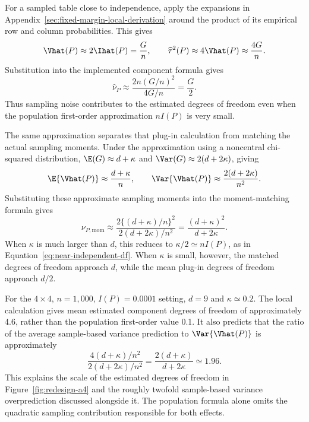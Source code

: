 For a sampled table close to independence, apply the expansions in
Appendix~\ref{sec:fixed-margin-local-derivation} around the product of its
empirical row and column probabilities. This gives
\begin{equation}
 \Vhat(P)\approx2\Ihat(P)=\frac{G}{n},
 \qquad \widehat\tau^2(P)\approx4\Vhat(P)\approx\frac{4G}{n}.
 \label{eq:small-mi-plugin-moments}
\end{equation}
Substitution into the implemented component formula gives
\begin{equation}
 \widehat\nu_P
 \approx\frac{2n(G/n)^2}{4G/n}=\frac{G}{2}.
 \label{eq:small-mi-plugin-df}
\end{equation}
Thus sampling noise contributes to the estimated degrees of freedom even
when the population first-order approximation \(nI(P)\) is very small.

The same approximation separates that plug-in calculation from matching
the actual sampling moments. Under the approximation using a noncentral
chi-squared distribution, \(\E(G)\approx d+\kappa\) and
\(\Var(G)\approx2(d+2\kappa)\), giving
\begin{equation}
 \E\{\Vhat(P)\}\approx\frac{d+\kappa}{n},
 \qquad
 \Var\{\Vhat(P)\}\approx\frac{2(d+2\kappa)}{n^2}.
\end{equation}
Substituting these approximate sampling moments into the moment-matching
formula gives
\begin{equation}
 \nu_{P,\mathrm{mom}}
 \approx
 \frac{2\{(d+\kappa)/n\}^2}{2(d+2\kappa)/n^2}
 =\frac{(d+\kappa)^2}{d+2\kappa}.
 \label{eq:small-mi-moment-df}
\end{equation}
When \(\kappa\) is much larger than \(d\), this reduces to
\(\kappa/2\simeq nI(P)\), as in
Equation~\eqref{eq:near-independent-df}. When \(\kappa\) is small,
however, the matched degrees of freedom approach \(d\), while the mean
plug-in degrees of freedom approach \(d/2\).

For the \(4\times4\), \(n=1{,}000\), \(I(P)=0.0001\) setting,
\(d=9\) and \(\kappa\simeq0.2\). The local calculation gives mean
estimated component degrees of freedom of approximately 4.6, rather than
the population first-order value 0.1. It also predicts that the ratio of
the average sample-based variance prediction to
\(\Var\{\Vhat(P)\}\) is approximately
\begin{equation}
 \frac{4(d+\kappa)/n^2}{2(d+2\kappa)/n^2}
 =\frac{2(d+\kappa)}{d+2\kappa}\simeq1.96.
\end{equation}
This explains the scale of the estimated degrees of freedom in
Figure~\ref{fig:redesign-a4} and the roughly twofold sample-based
variance overprediction discussed alongside it.
The population formula alone omits the quadratic sampling contribution
responsible for both effects.

